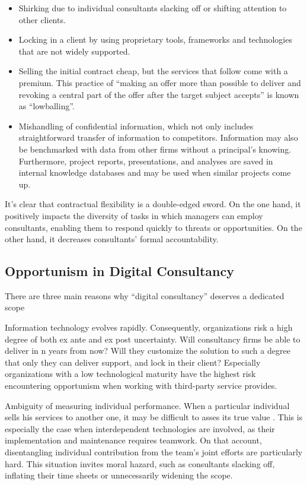 \documentclass[12pt]{article}
\begin{document}
\begin{itemize}
\item
  Shirking due to individual consultants slacking off or shifting
  attention to other clients.
\item
  Locking in a client by using proprietary tools, frameworks and
  technologies that are not widely supported.
\item
  Selling the initial contract cheap, but the services that follow come
  with a premium. This practice of ``making an offer more than possible
  to deliver and revoking a central part of the offer after the target
  subject accepts'' \citep[ 219]{motes1979} is known as ``lowballing''.
\item
  Mishandling of confidential information, which not only includes
  straightforward transfer of information to competitors. Information
  may also be benchmarked with data from other firms without a
  principal's knowing. Furthermore, project reports, presentations, and
  analyses are saved in internal knowledge databases and may be used
  when similar projects come up. \citep[ 72-73]{armbruster2006}
\end{itemize}

It's clear that contractual flexibility is a double-edged sword. On the
one hand, it positively impacts the diversity of tasks in which managers
can employ consultants, enabling them to respond quickly to threats or
opportunities. On the other hand, it decreases consultants' formal
accountability.

\subsection{Opportunism in Digital
Consultancy}\label{opportunism-in-digital-consultancy}

There are three main reasons why ``digital consultancy'' deserves a
dedicated scope

Information technology evolves rapidly. Consequently, organizations risk
a high degree of both ex ante and ex post uncertainty. Will consultancy
firms be able to deliver in n years from now? Will they customize the
solution to such a degree that only they can deliver support, and lock
in their client? Especially organizations with a low technological
maturity have the highest risk encountering opportunism when working
with third-party service provides.

Ambiguity of measuring individual performance. When a particular
individual sells his services to another one, it may be difficult to
asses its true value \citep[ 134-135]{ouchi1980}. This is especially the
case when interdependent technologies are involved, as their
implementation and maintenance requires teamwork. On that account,
disentangling individual contribution from the team's joint efforts are
particularly hard. This situation invites moral hazard, such as
consultants slacking off, inflating their time sheets or unnecessarily
widening the scope.
\end{document}
